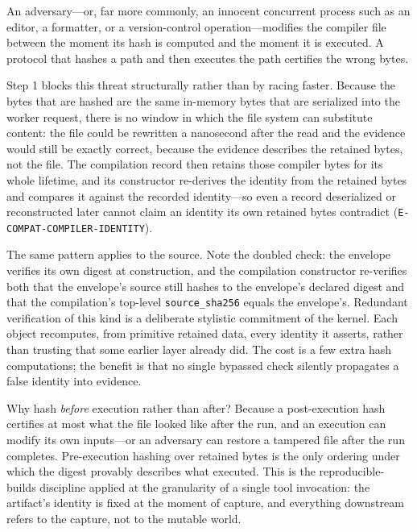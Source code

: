 \begin{threat}\label{ch07:threat:toctou}
An adversary---or, far more commonly, an innocent concurrent process such as an editor, a formatter, or a version-control operation---modifies the compiler file between the moment its hash is computed and the moment it is executed. A protocol that hashes a path and then executes the path certifies the wrong bytes.
\end{threat}

Step 1 blocks this threat structurally rather than by racing faster. Because the bytes that are hashed are the same in-memory bytes that are serialized into the worker request, there is no window in which the file system can substitute content: the file could be rewritten a nanosecond after the read and the evidence would still be exactly correct, because the evidence describes the retained bytes, not the file. The compilation record then retains those compiler bytes for its whole lifetime, and its constructor re-derives the identity from the retained bytes and compares it against the recorded identity---so even a record deserialized or reconstructed later cannot claim an identity its own retained bytes contradict (\texttt{E-COMPAT-COMPILER-IDENTITY}).

The same pattern applies to the source. Note the doubled check: the envelope verifies its own digest at construction, and the compilation constructor re-verifies both that the envelope's source still hashes to the envelope's declared digest and that the compilation's top-level \texttt{source\_sha256} equals the envelope's. Redundant verification of this kind is a deliberate stylistic commitment of the kernel. Each object recomputes, from primitive retained data, every identity it asserts, rather than trusting that some earlier layer already did. The cost is a few extra hash computations; the benefit is that no single bypassed check silently propagates a false identity into evidence.

Why hash \emph{before} execution rather than after? Because a post-execution hash certifies at most what the file looked like after the run, and an execution can modify its own inputs---or an adversary can restore a tampered file after the run completes. Pre-execution hashing over retained bytes is the only ordering under which the digest provably describes what executed. This is the reproducible-builds discipline \cite{reprobuilds} applied at the granularity of a single tool invocation: the artifact's identity is fixed at the moment of capture, and everything downstream refers to the capture, not to the mutable world.

